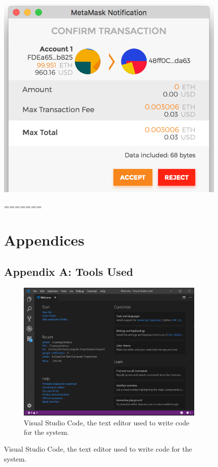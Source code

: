 \begin{figure}[H]
\center
\includegraphics[scale=0.4]{images/MetamaskNotification.png}
\caption{A transaction awaiting confirmation from the user.}
=======
\chapter{Appendices}
\section{Appendix A: Tools Used}

\begin{figure}[H]
\center
\includegraphics[scale=0.4]{images/vscode.png}
\caption{Visual Studio Code, the text editor used to write code for the system.}
\end{figure}


\end{figure}

